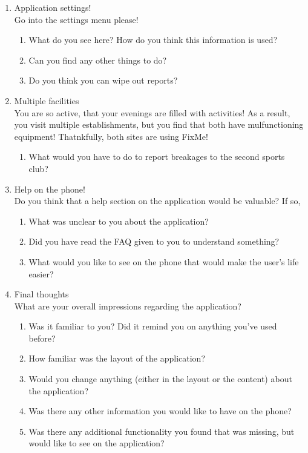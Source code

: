 \documentclass[12pt]{article}
\begin{document}
\begin{enumerate}
\item Application settings!\\
Go into the settings menu please!
\begin{enumerate}
\item What do you see here? How do you think this information is used?
\item Can you find any other things to do?
\item Do you think you can wipe out reports?
\end{enumerate}

\item Multiple facilities\\
You are so active, that your evenings are filled with activities! As a result, you visit multiple establishments, but you find that both have mulfunctioning equipment! Thatnkfully, both sites are using FixMe!
\begin{enumerate}
\item What would you have to do to report breakages to the second sports club?
\end{enumerate}

\item Help on the phone!\\
Do you think that a help section on the application would be valuable? If so,
\begin{enumerate}
\item What was unclear to you about the application?
\item Did you have read the FAQ given to you to understand something?
\item What would you like to see on the phone that would make the user's life easier?
\end{enumerate}

\item Final thoughts\\
What are your overall impressions regarding the application?
\begin{enumerate}
\item Was it familiar to you? Did it remind you on anything you've used before?
\item How familiar was the layout of the application?
\item Would you change anything (either in the layout or the content) about the application?
\item Was there any other information you would like to have on the phone?
\item Was there any additional functionality you found that was missing, but would like to see on the application?
\end{enumerate}

\end{enumerate}
\end{document}
